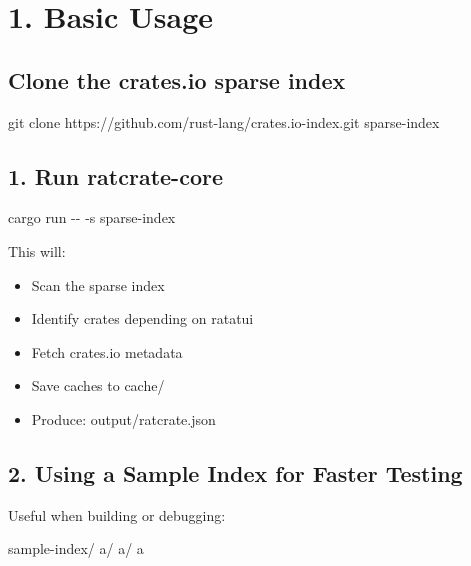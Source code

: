 \documentclass[
  letterpaper,
  DIV=11,
  numbers=noendperiod]{scrreprt}
\newenvironment{Shaded}{\begin{snugshade}}{\end{snugshade}}
\newcommand{\AttributeTok}[1]{\textcolor[rgb]{0.40,0.45,0.13}{#1}}
\newcommand{\ExtensionTok}[1]{\textcolor[rgb]{0.00,0.23,0.31}{#1}}
\newcommand{\FunctionTok}[1]{\textcolor[rgb]{0.28,0.35,0.67}{#1}}
\newcommand{\NormalTok}[1]{\textcolor[rgb]{0.00,0.23,0.31}{#1}}
\providecommand{\tightlist}{%
  \setlength{\itemsep}{0pt}\setlength{\parskip}{0pt}}
\begin{document}
\section{1. Basic Usage}\label{basic-usage}

\subsection{Clone the crates.io sparse
index}\label{clone-the-crates.io-sparse-index}

\begin{Shaded}
\begin{Highlighting}[]
\FunctionTok{git}\NormalTok{ clone https://github.com/rust{-}lang/crates.io{-}index.git sparse{-}index}
\end{Highlighting}
\end{Shaded}

\subsection{1. Run ratcrate-core}\label{run-ratcrate-core}

\begin{Shaded}
\begin{Highlighting}[]
\ExtensionTok{cargo}\NormalTok{ run }\AttributeTok{{-}{-}} \AttributeTok{{-}s}\NormalTok{ sparse{-}index}
\end{Highlighting}
\end{Shaded}

This will:

\begin{itemize}
\tightlist
\item
  Scan the sparse index
\item
  Identify crates depending on ratatui
\item
  Fetch crates.io metadata
\item
  Save caches to cache/
\item
  Produce: output/ratcrate.json
\end{itemize}

\subsection{2. Using a Sample Index for Faster
Testing}\label{using-a-sample-index-for-faster-testing}

Useful when building or debugging:

\begin{Shaded}
\begin{Highlighting}[]
\NormalTok{sample{-}index/}
\NormalTok{  a/}
\NormalTok{    a/}
\NormalTok{      a}
\end{Highlighting}
\end{Shaded}
\end{document}
